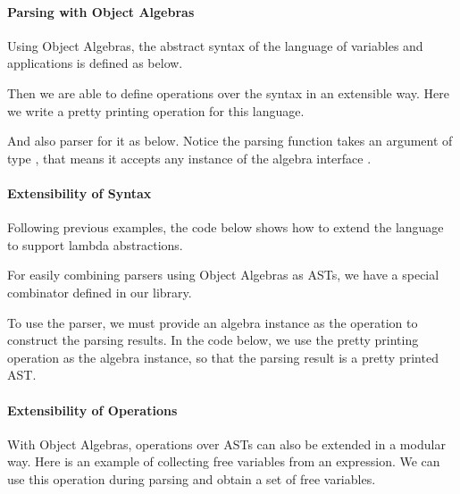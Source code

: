 \paragraph{Parsing with Object Algebras} Using Object Algebras, the abstract syntax of the language of variables and applications is defined as below.


Then we are able to define operations over the syntax in an extensible way. Here we write a pretty printing operation for this language.


And also parser for it as below. Notice the parsing function  takes an argument of type , that means it accepts any instance of the algebra interface .


\paragraph{Extensibility of Syntax} Following previous examples, the code below shows how to extend the language to support lambda abstractions.


For easily combining parsers using Object Algebras as ASTs, we have a special combinator  defined in our library.

To use the parser, we must provide an algebra instance as the operation to construct the parsing results. In the code below, we use the pretty printing operation  as the algebra instance, so that the parsing result is a pretty printed AST.


\paragraph{Extensibility of Operations} With Object Algebras, operations over ASTs can also be extended in a modular way. Here is an example of collecting free variables from an expression. We can use this operation during parsing and obtain a set of free variables.

